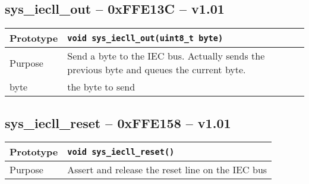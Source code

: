\subsection*{sys\_iecll\_out -- 0xFFE13C -- v1.01}
\begin{table}[!h]\begin{tabular}{|l||l|} \hline
Prototype & \lstinline!void sys_iecll_out(uint8_t byte)! \\ \hline
Purpose & Send a byte to the IEC bus. Actually sends the previous byte and queues the current byte. \\ \hline
byte & the byte to send \\ \hline
\end{tabular}\end{table}

\subsection*{sys\_iecll\_reset -- 0xFFE158 -- v1.01}
\begin{table}[!h]\begin{tabular}{|l||l|} \hline
Prototype & \lstinline!void sys_iecll_reset()! \\ \hline
Purpose & Assert and release the reset line on the IEC bus \\ \hline
\end{tabular}\end{table}

